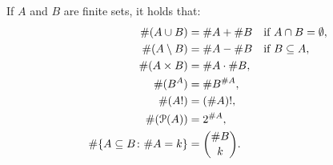 \begin{theorem}
  \label{th:combinatoria}
  If $A$ and $B$ are finite sets, it holds that:
  \begin{align}
    \#(A\cup B) &= \#A + \#B \quad \text{if $A\cap B=\emptyset$},\\
    \#(A\setminus B) &= \#A - \#B \quad \text{if $B\subseteq A$},\\
    \#(A\times B) &= \#A \cdot \#B, \\
    \#(B^A) &= \#B^{\#A}, \\
    \#(A!) &= (\#A)!, \\
    \#(\mathcal P(A)) &= 2^{\#A}, \\
    \#{\left\{ A\subseteq B \colon \#A=k \right\}} &= \binom{\#B}{k}.
  \end{align}
\end{theorem}
